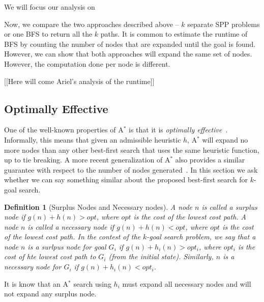 \documentclass{aicom2e}
\newtheorem{definition}{Definition}
\newcommand{\kgs}{$k$-goal search}
\newcommand{\astar}{A$^*$}
\begin{document}
We will focus our analysis on 





Now, we compare the two approaches described above -- $k$ separate SPP problems or one BFS to return all the $k$ paths. 
It is common to estimate the runtime of BFS by counting the number of nodes that are expanded until the goal is found. However, we can show that both approaches will expand the same set of nodes.  However, the computation done per node is different. 

[[Here will come Ariel's analysis of the runtime]]

\subsection{Optimally Effective}
One of the well-known properties of \astar{} is that it is {\em optimally effective}~\cite{dechter}. Informally, this means that given an admissible heuristic $h$, \astar{} will expand no more nodes than any other best-first search
that uses the same heuristic function, up to tie breaking. 
A more recent generalization of \astar{} also provides a similar guarantee
with respect to the number of nodes generated~\cite{Goldenberg}. 
In this section we ask whether we can say something similar about the proposed
best-first search for \kgs{}. 

\begin{definition}[Surplus Nodes and Necessary nodes]
A node $n$ is called a surplus node if $g(n)+h(n)>opt$, where $opt$ is the cost of the lowest cost path. 
A node $n$ is called a necessary node if $g(n)+h(n)<opt$, where $opt$ is the cost of the lowest cost path. 
In the contest of the \kgs{} problem, we say that a node $n$ is a surlpus node for goal $G_i$ if $g(n)+h_i(n)>opt_i$, where $opt_i$ is the cost of hte lowest cost path to $G_i$ (from the initial state). Similarly, $n$ is a necessary node for $G_i$
if $g(n)+h_i(n)<opt_i$. 
\end{definition}
It is know that an \astar{} search using $h_i$ 
must expand all necessary nodes and will not expand any surplus node. 
\end{document}
